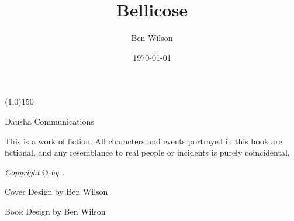 \documentclass[letterpaper,10pt,twoside,makeidx]{memoir}
\title{Bellicose}
\author{Ben Wilson}
\date{\today}
\begin{document}
\frontmatter
  \begin{titlingpage}
  \pagestyle{empty}
  \begin{center}
  \vspace*{\fill}

  \HUGE\textbf{\textsf\thetitle}

  \vspace*{0.25in}
  \line(1,0){150}
  \vspace*{0.25in}

  \Large\textsf\theauthor

  \vspace*{\fill}

  \vspace*{\fill}
  \hspace*{\fill}\textsf{Dausha}\hspace*{\fill}\newline%
  \textsf{Communications}
  \end{center}
  \end{titlingpage}

  \vspace*{\fill}
  \pagestyle{empty}

  \par\noindent\emph{\thetitle}
  \newline
  
  \par\noindent This is a work of fiction. All characters and events portrayed in this
  book are fictional, and any resemblance to real people or incidents is
  purely coincidental.\newline

  \par\noindent\emph{Copyright \copyright{} \yearonly{} by \theauthor.}\newline
  
  \par\noindent Cover Design by Ben Wilson\newline

  \par\noindent Book Design by Ben Wilson\newline
\end{document}
